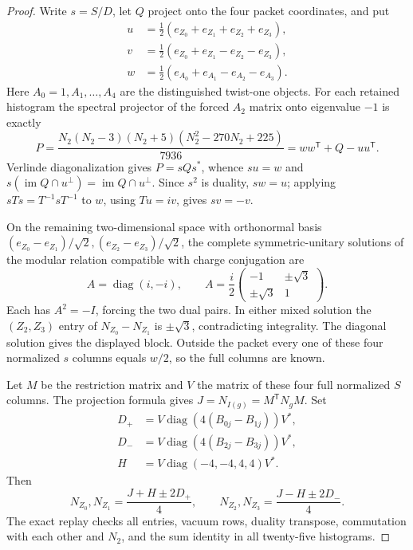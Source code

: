 \begin{proof}
Write $s=S/D$, let $Q$ project onto the four packet coordinates, and
put
\[
\begin{aligned}
 u&=\tfrac12(e_{Z_0}+e_{Z_1}+e_{Z_2}+e_{Z_3}),\\
 v&=\tfrac12(e_{Z_0}+e_{Z_1}-e_{Z_2}-e_{Z_3}),\\
 w&=\tfrac12(e_{A_0}+e_{A_1}-e_{A_2}-e_{A_3}).
\end{aligned}
\]
Here $A_0=1,A_1,\ldots,A_4$ are the distinguished twist-one objects.
For each retained histogram the spectral projector of the forced
$A_2$ matrix onto eigenvalue $-1$ is exactly
\[
 P=\frac{N_2(N_2-3)(N_2+5)(N_2^2-270N_2+225)}{7936}
   =ww^{\mathsf T}+Q-uu^{\mathsf T}.
\]
Verlinde diagonalization gives $P=sQs^*$, whence $su=w$ and
$s(\operatorname{im}Q\cap u^\perp)=\operatorname{im}Q\cap u^\perp$.
Since $s^2$ is duality, $sw=u$; applying $sTs=T^{-1}sT^{-1}$ to
$w$, using $Tu=iv$, gives $sv=-v$.

On the remaining two-dimensional space with orthonormal basis
$(e_{Z_0}-e_{Z_1})/\sqrt2,(e_{Z_2}-e_{Z_3})/\sqrt2$, the complete
symmetric-unitary solutions of the modular relation compatible with
charge conjugation are
\[
 A=\operatorname{diag}(i,-i),\qquad
 A=\frac i2\begin{pmatrix}-1&\pm\sqrt3\\\pm\sqrt3&1\end{pmatrix}.
\]
Each has $A^2=-I$, forcing the two dual pairs. In either mixed
solution the $(Z_2,Z_3)$ entry of $N_{Z_0}-N_{Z_1}$ is
$\pm\sqrt3$, contradicting integrality. The diagonal solution gives
the displayed block. Outside the packet every one of these four
normalized $s$ columns equals $w/2$, so the full columns are known.

Let $M$ be the restriction matrix and $V$ the matrix of these four
full normalized $S$ columns. The projection formula gives
$J=N_{I(g)}=M^{\mathsf T}N_gM$. Set
\[
\begin{aligned}
 D_+&=V\operatorname{diag}(4(B_{0j}-B_{1j}))V^*,\\
 D_-&=V\operatorname{diag}(4(B_{2j}-B_{3j}))V^*,\\
 H&=V\operatorname{diag}(-4,-4,4,4)V^*.
\end{aligned}
\]
Then
\[
 N_{Z_0},N_{Z_1}=\frac{J+H\pm2D_+}{4},\qquad
 N_{Z_2},N_{Z_3}=\frac{J-H\pm2D_-}{4}.
\]
The exact replay checks all entries, vacuum rows, duality transpose,
commutation with each other and $N_2$, and the sum identity in all
twenty-five histograms.
\end{proof}

